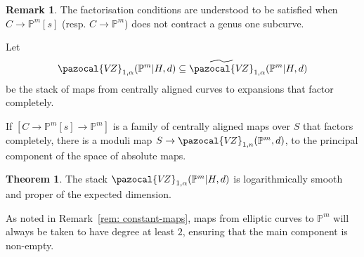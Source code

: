 \documentclass[11pt]{amsart}
\newcommand{\PP}{\mathbb P}
\newcommand{\VZ}{\pazocal{V\!Z}}
\renewcommand{\to}{\rightarrow}
\theoremstyle{definition}
\newtheorem{thm}{Theorem}[section]
\theoremstyle{definition}
\newtheorem*{rem}{Remark}
\begin{document}
\begin{rem}
 The factorisation conditions are understood to be satisfied when $C\to \mathbb P^m[s]$ (resp. $C\to \mathbb P^m$) does not contract a genus one subcurve. 
\end{rem}

Let
\begin{equation*} \VZ_{1,\alpha}(\mathbb P^m|H,d) \subseteq \widetilde\VZ_{1,\alpha}(\PP^m|H,d) \end{equation*}
be the stack of maps from centrally aligned curves to expansions that factor completely.

If $[C\to \mathbb P^m[s]\to \mathbb P^m]$ is a family of centrally aligned maps over $S$ that factors completely, there is a moduli map $S\to \VZ_{1,n}(\mathbb P^m,d)$, to the principal component of the space of absolute maps. 

\begin{thm}\label{thm: log-smoothness}
The stack $\VZ_{1,\alpha}(\mathbb P^m|H,d)$ is logarithmically smooth and proper of the expected dimension.
\end{thm}

As noted in Remark~\ref{rem: constant-maps}, maps from elliptic curves to $\PP^m$ will always be taken to have degree at least $2$, ensuring that the main component is non-empty. 
\end{document}

